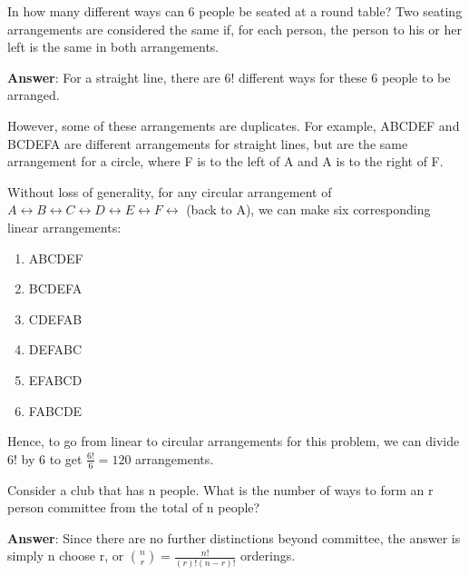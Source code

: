 \documentclass[12pt]{article}
\newenvironment{exercise}[2][Exercise]{\begin{trivlist}
\item[\hskip \labelsep {\bfseries #1}\hskip \labelsep {\bfseries #2.}]}{\end{trivlist}}
\begin{document}
\begin{exercise}{1.7}
In how many different ways can 6 people be seated at a round table? Two seating arrangements are considered the same if, for each person, the person to his or her left is the same in both arrangements.

\textbf{Answer}: For a straight line, there are 6! different ways for these 6 people to be arranged. 

However, some of these arrangements are duplicates. For example, ABCDEF and BCDEFA are different arrangements for straight lines, but are the same arrangement for a circle, where F is to the left of A and A is to the right of F. 

Without loss of generality, for any circular arrangement of $A \leftrightarrow B \leftrightarrow C \leftrightarrow D \leftrightarrow E \leftrightarrow F \leftrightarrow$ (back to A), we can make six corresponding linear arrangements:
\begin{enumerate}[label=(\arabic*)]
\item ABCDEF
\item BCDEFA
\item CDEFAB
\item DEFABC
\item EFABCD
\item FABCDE
\end{enumerate}

Hence, to go from linear to circular arrangements for this problem, we can divide 6! by 6 to get $\frac{6!}{6} = \boxed{120}$ arrangements.

\end{exercise}



\begin{exercise}{1.8}
 Consider a club that has n people. What is the number of ways to form an r person committee from the total of n people?

\textbf{Answer}: Since there are no further distinctions beyond committee, the answer is simply n choose r, or $\binom{n}{r} = \boxed{\frac{n!}{(r)!(n-r)!}}$ orderings.

\end{exercise}
\end{document}
